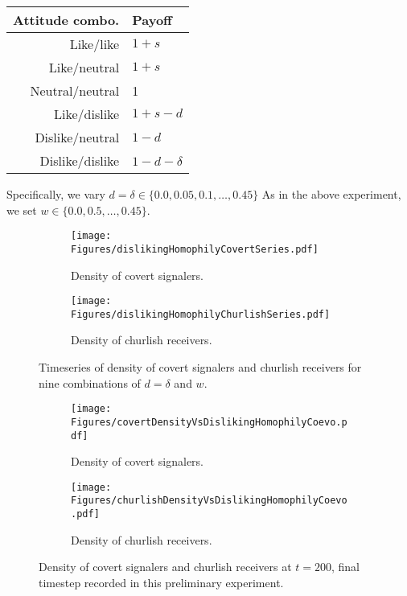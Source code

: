 \documentclass[11pt,letterpaper]{article}
\begin{document}
\begin{table}[H]
  \centering
  \begin{tabular}{rl}
   Attitude combo. & Payoff \\
   \toprule
    Like/like & $1 + s$ \\
    Like/neutral & $1 + s$ \\
    Neutral/neutral & 1 \\
    Like/dislike & $1 + s - d$ \\
    Dislike/neutral & $1 - d$ \\
    Dislike/dislike & $1 - d - \delta$
  \end{tabular}
\end{table}

Specifically, we vary $d=\delta \in \{0.0, 0.05, 0.1, \ldots, 0.45\}$
As in the above experiment, we set $w \in \{0.0, 0.5, \ldots, 0.45\}$.

\begin{figure}[H]

  \centering
  \begin{subfigure}{0.49\textwidth}
    \centering
    \texttt{[image: Figures/dislikingHomophilyCovertSeries.pdf]}
    \caption{Density of covert signalers.}
  \end{subfigure}
  \begin{subfigure}{0.49\textwidth}
    \centering
    \texttt{[image: Figures/dislikingHomophilyChurlishSeries.pdf]}
    \caption{Density of churlish receivers.}
  \end{subfigure}
  
  \caption{Timeseries of density of covert signalers and churlish receivers
    for nine combinations of $d=\delta$ and $w$.}
  \label{fig:dislikingHomophilySeries}
\end{figure}

\begin{figure}[H]
  \centering
  \begin{subfigure}{0.49\textwidth}
    \centering
    \texttt{[image: Figures/covertDensityVsDislikingHomophilyCoevo.pdf]}
    \caption{Density of covert signalers.}
  \end{subfigure}
  \begin{subfigure}{0.49\textwidth}
    \centering
    \texttt{[image: Figures/churlishDensityVsDislikingHomophilyCoevo.pdf]}
    \caption{Density of churlish receivers.}
  \end{subfigure}
  
  \caption{Density of covert signalers and churlish receivers at $t=200$, 
    final timestep recorded in this preliminary experiment.}
  \label{fig:dislikingHomophilyHeatmap}
\end{figure}
\end{document}
